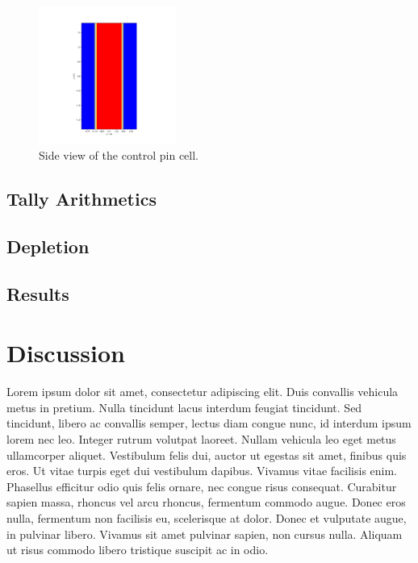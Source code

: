 \documentclass[twocolumn,a4paper,10pt]{article}
\begin{document}
\begin{figure}[ht]
  \centering
  \includegraphics[width=0.4\textwidth]{../Pictures/Controlrods_plot_yz.png}
  \caption{Side view of the control pin cell.}
\end{figure}


\subsection{Tally Arithmetics}

\subsection{Depletion}

\subsection{Results}



\section{Discussion}
\label{sec:Discussion}

Lorem ipsum dolor sit amet, consectetur adipiscing elit. Duis convallis vehicula metus in pretium. Nulla tincidunt lacus interdum feugiat tincidunt. Sed tincidunt, libero ac convallis semper, lectus diam congue nunc, id interdum ipsum lorem nec leo. Integer rutrum volutpat laoreet. Nullam vehicula leo eget metus ullamcorper aliquet. Vestibulum felis dui, auctor ut egestas sit amet, finibus quis eros. Ut vitae turpis eget dui vestibulum dapibus. Vivamus vitae facilisis enim. Phasellus efficitur odio quis felis ornare, nec congue risus consequat. Curabitur sapien massa, rhoncus vel arcu rhoncus, fermentum commodo augue. Donec eros nulla, fermentum non facilisis eu, scelerisque at dolor. Donec et vulputate augue, in pulvinar libero. Vivamus sit amet pulvinar sapien, non cursus nulla. Aliquam ut risus commodo libero tristique suscipit ac in odio.
\end{document}
